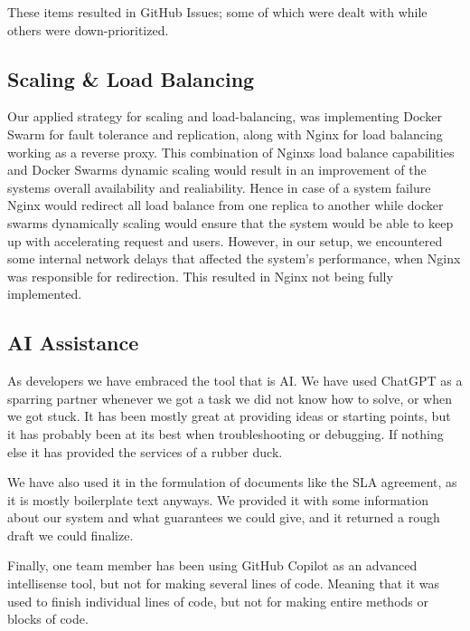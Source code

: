 \noindent These items resulted in GitHub Issues; some of which were dealt with while others were down-prioritized.

\subsection{Scaling \& Load Balancing}

Our applied strategy for scaling and load-balancing, was implementing Docker Swarm for fault tolerance and replication, along with Nginx for load balancing working as a reverse proxy. This combination of Nginxs load balance capabilities and Docker Swarms dynamic scaling would result in an improvement of the systems overall availability and realiability. Hence in case of a system failure Nginx would redirect all load balance from one replica to another while docker swarms dynamically scaling would ensure that the system would be able to keep up with accelerating request and users. However, in our setup, we encountered some internal network delays that affected the system's performance, when Nginx was responsible for redirection. This resulted in Nginx not being fully implemented.



\subsection{AI Assistance}



\noindent As developers we have embraced the tool that is AI. We have used ChatGPT as a sparring partner whenever we got a task we did not know how to solve, or when we got stuck. It has been mostly great at providing ideas or starting points, but it has probably been at its best when troubleshooting or debugging. If nothing else it has provided the services of a rubber duck.

\noindent We have also used it in the formulation of documents like the SLA agreement, as it is mostly boilerplate text anyways. We provided it with some information about our system and what guarantees we could give, and it returned a rough draft we could finalize.

\noindent Finally, one team member has been using GitHub Copilot as an advanced intellisense tool, but not for making several lines of code. Meaning that it was used to finish individual lines of code, but not for making entire methods or blocks of code.